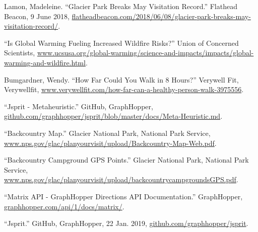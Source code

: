 \documentclass[12pt]{article}
\begin{document}
\begin{thebibliography}{}
     Lamon, Madeleine. “Glacier Park Breaks May Visitation Record.” Flathead Beacon, 9 June 2018, \url{flatheadbeacon.com/2018/06/08/glacier-park-breaks-may-visitation-record/}.
    
     “Is Global Warming Fueling Increased Wildfire Risks?” Union of Concerned Scientists, \url{www.ucsusa.org/global-warming/science-and-impacts/impacts/global-warming-and-wildfire.html}.
    
     Bumgardner, Wendy. “How Far Could You Walk in 8 Hours?” Verywell Fit, Verywellfit, \url{www.verywellfit.com/how-far-can-a-healthy-person-walk-3975556}.
    
     “Jsprit - Metaheuristic.” GitHub, GraphHopper, \url{github.com/graphhopper/jsprit/blob/master/docs/Meta-Heuristic.md}.
    
     “Backcountry Map.” Glacier National Park, National Park Service, \url{www.nps.gov/glac/planyourvisit/upload/Backcountry-Map-Web.pdf}.
    
     “Backcountry Campground GPS Points.” Glacier National Park, National Park Service, \url{www.nps.gov/glac/planyourvisit/upload/backcountrycampgroundsGPS.pdf}.
    
     “Matrix API - GraphHopper Directions API Documentation.” GraphHopper, \url{graphhopper.com/api/1/docs/matrix/}.
    
     “Jsprit.” GitHub, GraphHopper, 22 Jan. 2019, \url{github.com/graphhopper/jsprit}.
\label{sec:bibliography}
\end{thebibliography}
\end{document}
